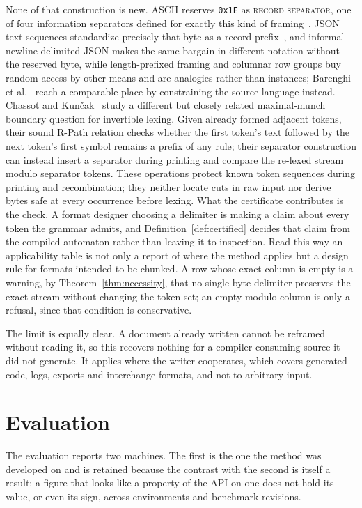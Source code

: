 \documentclass[11pt,a4paper]{article}
\theoremstyle{definition}
\theoremstyle{plain}
\newcommand{\code}[1]{\texttt{#1}}
\begin{document}
None of that construction is new. ASCII reserves \code{0x1E} as \textsc{record separator}, one of four information
separators defined for exactly this kind of framing~\cite{cerf1969ascii}, JSON text sequences standardize precisely that
byte as a record prefix~\cite{williams2015rfc7464}, and informal newline-delimited JSON makes the same bargain in
different notation without the reserved byte, while length-prefixed framing and columnar row groups buy random access by
other means and are analogies rather than instances; Barenghi et al.~\cite{barenghi2015parallel} reach a comparable
place by constraining the source language instead. Chassot and Kun{\v{c}}ak~\cite{chassot2026ziplex} study a different
but closely related maximal-munch boundary question for invertible lexing. Given already formed adjacent tokens, their
sound R-Path relation checks whether the first token's text followed by the next token's first symbol remains a prefix
of any rule; their separator construction can instead insert a separator during printing and compare the re-lexed stream
modulo separator tokens. These operations protect known token sequences during printing and recombination; they neither
locate cuts in raw input nor derive bytes safe at every occurrence before lexing. What the certificate contributes is
the check. A format designer choosing a delimiter is making a claim about every token the grammar admits, and
Definition~\ref{def:certified} decides that claim from the compiled automaton rather than leaving it to inspection. Read
this way an applicability table is not only a report of where the method applies but a design rule for formats intended
to be chunked. A row whose exact column is empty is a warning, by Theorem~\ref{thm:necessity}, that no single-byte
delimiter preserves the exact stream without changing the token set; an empty modulo column is only a refusal, since
that condition is conservative.

The limit is equally clear. A document already written cannot be reframed without reading it, so this recovers nothing
for a compiler consuming source it did not generate. It applies where the writer cooperates, which covers generated
code, logs, exports and interchange formats, and not to arbitrary input.

\section{Evaluation}
\label{sec:evaluation}

The evaluation reports two machines. The first is the one the method was developed on and is retained because the
contrast with the second is itself a result: a figure that looks like a property of the API on one does not hold its
value, or even its sign, across environments and benchmark revisions.
\end{document}

